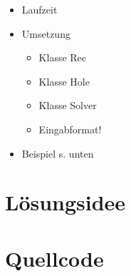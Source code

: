 \documentclass[a4paper,10pt,ngerman]{scrartcl}
\begin{document}
{\begin{itemize}
\begin{itemize}
\begin{itemize}
        \item was und wann kann nicht verbessert werden? (Beispiel 4: 7370) \checkmark
      \end{itemize}      
    \end{itemize}
    \item Laufzeit \checkmark
    \item Umsetzung
      \begin{itemize}
        \item Klasse Rec
        \item Klasse Hole
        \item Klasse Solver
        \item Eingabformat!
      \end{itemize}
    \item Beispiel s. unten
  \end{itemize}
}

\section{Lösungsidee}












\printbibliography





\section{Quellcode}

\end{document}
